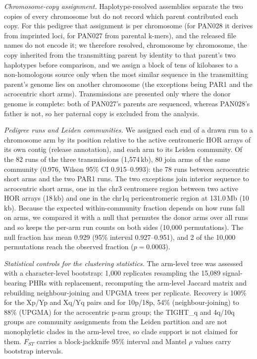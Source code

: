 \documentclass[pdflatex,mathphys]{jnl}
\begin{document}
\emph{Chromosome-copy assignment.} Haplotype-resolved assemblies separate the two
copies of every chromosome but do not record which parent contributed each copy. For this
pedigree that assignment is per chromosome (for PAN028 it derives from imprinted loci, for
PAN027 from parental k-mers), and the released file names do not encode it; we therefore
resolved, chromosome by chromosome, the copy inherited from the transmitting parent by
identity to that parent's two haplotypes before comparison, and we assign a block of tens
of kilobases to a non-homologous source only when the most similar sequence in the
transmitting parent's genome lies on another chromosome (the exceptions being PAR1 and the
acrocentric short arms). Transmissions are
presented only where the donor genome is complete: both of PAN027's parents are sequenced,
whereas PAN028's father is not, so her paternal copy is excluded from the analysis.

\emph{Pedigree runs and Leiden communities.} We assigned each end of a drawn run to a chromosome arm by
its position relative to the active centromeric HOR arrays of its own contig (release annotation), and
each arm to its Leiden community. Of the 82 runs of the three transmissions (1,574\,kb), 80 join arms of
the same community (0.976, Wilson 95\% CI 0.915--0.993): the 78 runs between acrocentric short arms and
the two PAR1 runs. The two exceptions join interior sequence to acrocentric short arms, one in the chr3
centromere region between two active HOR arrays (18\,kb) and one in the chr1q pericentromeric region at
131.0\,Mb (10\,kb). Because the expected within-community fraction depends on how runs fall on arms,
we compared it with a null that permutes the donor arms over all runs and so keeps the per-arm run
counts on both sides (10,000 permutations). The null fraction has mean 0.929 (95\% interval
0.927--0.951), and 2 of the 10,000 permutations reach the observed fraction ($p = 0.0003$).

\emph{Statistical controls for the clustering statistics.} The arm-level
tree was assessed with a character-level bootstrap: 1,000 replicates resampling the 15,089
signal-bearing PHRs with replacement, recomputing the arm-level Jaccard matrix and rebuilding
neighbour-joining and UPGMA trees per replicate. Recovery is 100\% for the Xp/Yp and Xq/Yq
pairs and for 10p/18p, 54\% (neighbour-joining) to 88\% (UPGMA) for the acrocentric p-arm
group; the TIGHT\_q and 4q/10q groups are community assignments from the Leiden partition and
are not monophyletic clades in the arm-level tree, so clade support is not claimed for them.
$F_{ST}$ carries a block-jackknife 95\% interval and Mantel $\rho$ values carry bootstrap
intervals.
\end{document}
